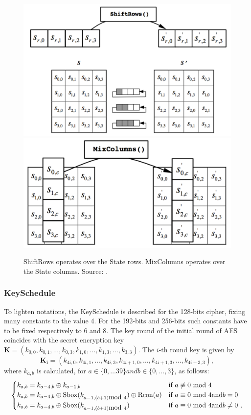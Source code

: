 \begin{figure}
\centering
\includegraphics[width = .45\textwidth]{../Figures/FISP_AES/shift_rows.pdf} 
\includegraphics[width = .45\textwidth]{../Figures/FISP_AES/mix_columns.pdf} 
\caption[ShiftRows and MixColumns.]{ShiftRows operates over the State rows. MixColumns operates over the State columns. Source: \cite{nist197}.}\label{fig:AES_sr_mc}
\end{figure}


\subsubsection*{KeySchedule}
To lighten notations, the KeySchedule is described for the 128-bits cipher, fixing many constants to the value 4. For the 192-bits and 256-bits such constants have to be fixed respectively to 6 and 8. The key round of the initial round of AES coincides with the secret encryption key $\boldsymbol{K} = (k_{0,0},k_{0,1},\dots,k_{0,3}, k_{1,0},\dots,k_{1,3},\dots,k_{3,3})$. The $i$-th round key is given by 
\begin{equation*}
\boldsymbol{K_i} = (k_{4i,0},k_{4i,1},\dots,k_{4i,3}, k_{4i+1,0},\dots,k_{4i+1,3},\dots,k_{4i+3,3}),
\end{equation*}
where $k_{a,b}$ is calculated, for $a\in\{0,\dots 39\} and b\in\{0,\dots,3\}$, as follows: 
\begin{equation*}
\begin{cases}
k_{a,b} = k_{a-4,b}\oplus k_{a-1,b} & \mbox{if } a \not\equiv 0 \mbox{ mod } 4\\
k_{a,b} = k_{a-4,b}\oplus \mathrm{Sbox}(k_{a-1,(b+1) \mbox{mod } 4}) \oplus \mathrm{Rcon}(a) & \mbox{if } a \equiv 0 \mbox{ mod } 4 \mathrm{and } b=0\\
k_{a,b} = k_{a-4,b}\oplus \mathrm{Sbox}(k_{a-1,(b+1) \mbox{mod } 4})  & \mbox{if } a \equiv 0 \mbox{ mod } 4 \mathrm{and } b\neq 0 \mbox{ ,} 
\end{cases}
\end{equation*}

